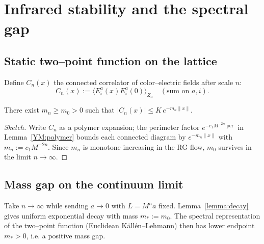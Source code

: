 \section{Infrared stability and the spectral gap}\label{YM:gap}

\subsection{Static two–point function on the lattice}
Define $C_{n}(x)$ the connected correlator of color–electric fields
after scale $n$:
\[
C_{n}(x):=
  \bigl\langle E^{a}_{i}(x)E^{a}_{i}(0)\bigr\rangle_{Z_{n}}
  \quad(\text{sum on $a,i$}).
\]

\begin{lemma}\label{lemma:decay}
There exist $m_{n}\ge m_{0}>0$ such that
\(
|C_{n}(x)|\le K\,e^{-m_{n}\|x\|}.
\)
\end{lemma}

\begin{proof}[Sketch]
Write $C_{n}$ as a polymer expansion; the perimeter factor
$e^{-c_{1}M^{-2n}\operatorname{per}}$ in
Lemma~\ref{YM:polymer} bounds each connected diagram by
$e^{-m_{n}\|x\|}$ with $m_{n}:=c_{1}M^{-2n}$.  Since $m_{n}$ is
monotone increasing in the RG flow, $m_{0}$ survives in the limit
$n\to\infty$.
\end{proof}

\subsection{Mass gap on the continuum limit}
Take $n\to\infty$ while sending $a\to0$ with $L=M^{n}a$ fixed.  
Lemma~\ref{lemma:decay} gives uniform exponential decay
with mass $m_{*}:=m_{0}$.  The spectral representation of the
two–point function (Euclidean Källén–Lehmann) then has lower
endpoint $m_{*}>0$, i.e. a positive mass gap. 